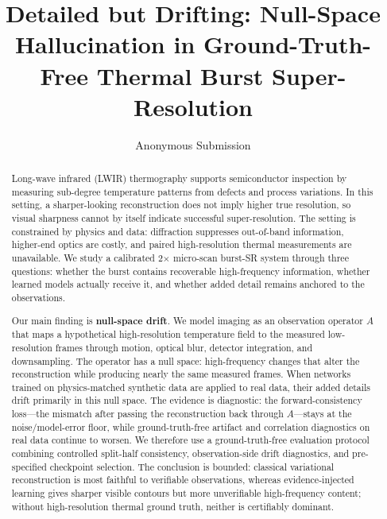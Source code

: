 \documentclass[letterpaper]{article}
\title{Detailed but Drifting: Null-Space Hallucination in Ground-Truth-Free Thermal Burst Super-Resolution}
\author{Anonymous Submission}
\begin{document}
\maketitle

\begin{abstract}
Long-wave infrared (LWIR) thermography supports semiconductor inspection by measuring sub-degree
temperature patterns from defects and process variations. In this setting, a sharper-looking
reconstruction does not imply higher true resolution, so visual sharpness cannot by itself indicate
successful super-resolution. The setting is constrained by physics and data: diffraction suppresses
out-of-band information, higher-end optics are costly, and paired high-resolution thermal
measurements are unavailable. We study a calibrated 2$\times$ micro-scan burst-SR system through three
questions: whether the burst contains recoverable high-frequency information, whether learned
models actually receive it, and whether added detail remains anchored to the observations.

Our main finding is \textbf{null-space drift}. We model imaging as an observation operator $A$ that maps a
hypothetical high-resolution temperature field to the measured low-resolution frames through
motion, optical blur, detector integration, and downsampling. The operator has a null space:
high-frequency changes that alter the reconstruction while producing nearly the same measured
frames. When networks trained on physics-matched synthetic data are applied to real data, their
added details drift primarily in this null space. The evidence is diagnostic: the
forward-consistency loss---the mismatch after passing the reconstruction back through $A$---stays at the
noise/model-error floor, while ground-truth-free artifact and correlation diagnostics on real data
continue to worsen. We therefore use a ground-truth-free evaluation protocol combining controlled
split-half consistency, observation-side drift diagnostics, and pre-specified checkpoint selection.
The conclusion is bounded: classical variational reconstruction is most faithful to verifiable
observations, whereas evidence-injected learning gives sharper visible contours but more
unverifiable high-frequency content; without high-resolution thermal ground truth, neither is
certifiably dominant.
\end{abstract}





\end{document}

